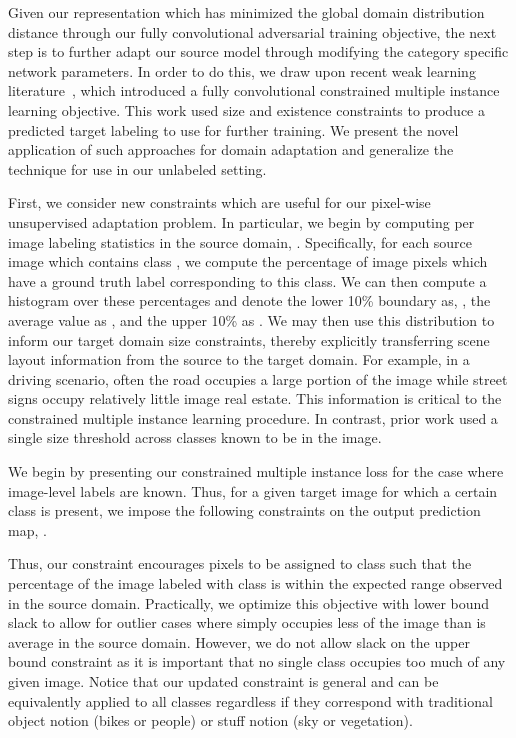 \documentclass[10pt,twocolumn,letterpaper]{article}
\begin{document}
Given our representation which has minimized the global domain distribution distance through our fully convolutional adversarial training objective, the next step is to further adapt our source model through modifying the category specific network parameters. In order to do this, we draw upon recent weak learning literature~\cite{pathak2015constrained,pathak2015fully}, which introduced a fully convolutional constrained multiple instance learning objective. This work used size and existence constraints to produce a predicted target labeling to use for further training. We present the novel application of such approaches for domain adaptation and generalize the technique for use in our unlabeled setting. 

First, we consider new constraints which are useful for our pixel-wise unsupervised adaptation problem. In particular, we begin by computing per image labeling statistics in the source domain, . Specifically, for each source image which contains class , we compute the percentage of image pixels which have a ground truth label corresponding to this class. We can then compute a histogram over these percentages and denote the lower 10\% boundary as, , the average value as , and the upper 10\% as . We may then use this distribution to inform our target domain size constraints, thereby explicitly transferring scene layout information from the source to the target domain. For example, in a driving scenario, often the road occupies a large portion of the image while street signs occupy relatively little image real estate. This information is critical to the constrained multiple instance learning procedure. In contrast, prior work used a single size threshold across classes known to be in the image.

We begin by presenting our constrained multiple instance loss for the case where image-level labels are known. Thus, for a given target image for which a certain class  is present, we impose the following constraints on the output prediction map, .



Thus, our constraint encourages pixels to be assigned to class  such that the percentage of the image labeled with class  is within the expected range observed in the source domain.
Practically, we optimize this objective with lower bound slack to allow for outlier cases where  simply occupies less of the image than is average in the source domain. However, we do not allow slack on the upper bound constraint as it is important that no single class occupies too much of any given image.
Notice that our updated constraint is general and can be equivalently applied to all classes regardless if they correspond with traditional object notion (\eg bikes or people) or stuff notion (\eg sky or vegetation). 
\end{document}
